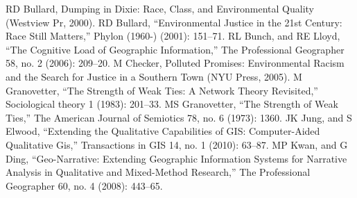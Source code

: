 RD Bullard, Dumping in Dixie: Race, Class, and Environmental Quality (Westview Pr, 2000).
RD Bullard, ``Environmental Justice in the 21st Century: Race Still Matters,'' Phylon (1960-) (2001): 151--71.
RL Bunch, and RE Lloyd, ``The Cognitive Load of Geographic Information,'' The Professional Geographer 58, no. 2 (2006): 209--20.
M Checker, Polluted Promises: Environmental Racism and the Search for Justice in a Southern Town (NYU Press, 2005).
M Granovetter, ``The Strength of Weak Ties: A Network Theory Revisited,'' Sociological theory 1 (1983): 201--33.
MS Granovetter, ``The Strength of Weak Ties,'' The American Journal of Semiotics 78, no. 6 (1973): 1360.
JK Jung, and S Elwood, ``Extending the Qualitative Capabilities of GIS: Computer-Aided Qualitative Gis,'' Transactions in GIS 14, no. 1 (2010): 63--87.
MP Kwan, and G Ding, ``Geo-Narrative: Extending Geographic Information Systems for Narrative Analysis in Qualitative and Mixed-Method Research,'' The Professional Geographer 60, no. 4 (2008): 443--65.




